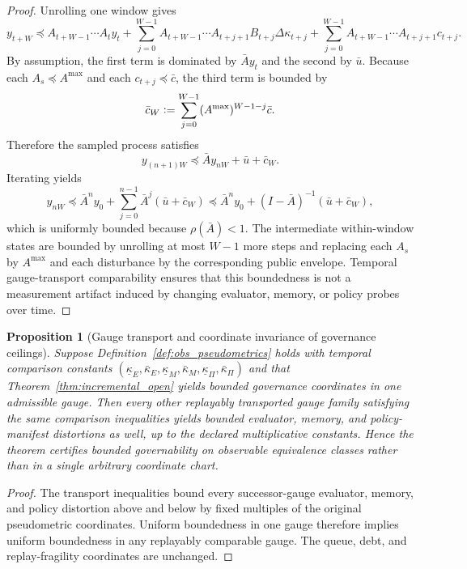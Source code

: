 \documentclass[11pt]{article}
\newtheorem{proposition}[theorem]{Proposition}
\theoremstyle{definition}
\newcommand{\1}{\mathbf{1}}
\newcommand{\Defeq}{\vcentcolon=}
\begin{document}
\begin{proof}
Unrolling one window gives
\[
y_{t+W}
\preceq
A_{t+W-1}\cdots A_t y_t
+
\sum_{j=0}^{W-1}A_{t+W-1}\cdots A_{t+j+1}B_{t+j}\Delta \kappa_{t+j}
+
\sum_{j=0}^{W-1}A_{t+W-1}\cdots A_{t+j+1}c_{t+j}.
\]
By assumption, the first term is dominated by $\bar A y_t$ and the second by $\bar u$. Because each $A_s\preceq A^{\max}$ and each $c_{t+j}\preceq \bar c$, the third term is bounded by
\[
\bar c_W \Defeq \sum_{j=0}^{W-1}(A^{\max})^{W-1-j}\bar c.
\]
Therefore the sampled process satisfies
\[
y_{(n+1)W}\preceq \bar A y_{nW} + \bar u + \bar c_W.
\]
Iterating yields
\[
y_{nW}\preceq \bar A^n y_0 + \sum_{j=0}^{n-1}\bar A^j(\bar u+\bar c_W)
\preceq
\bar A^n y_0 + (I-\bar A)^{-1}(\bar u+\bar c_W),
\]
which is uniformly bounded because $\rho(\bar A)<1$. The intermediate within-window states are bounded by unrolling at most $W-1$ more steps and replacing each $A_s$ by $A^{\max}$ and each disturbance by the corresponding public envelope. Temporal gauge-transport comparability ensures that this boundedness is not a measurement artifact induced by changing evaluator, memory, or policy probes over time.
\end{proof}

\begin{proposition}[Gauge transport and coordinate invariance of governance ceilings]\label{prop:gauge_transport}
Suppose Definition~\ref{def:obs_pseudometrics} holds with temporal comparison constants $(\underline\kappa_E,\bar\kappa_E,\underline\kappa_M,\bar\kappa_M,\underline\kappa_\Pi,\bar\kappa_\Pi)$ and that Theorem~\ref{thm:incremental_open} yields bounded governance coordinates in one admissible gauge. Then every other replayably transported gauge family satisfying the same comparison inequalities yields bounded evaluator, memory, and policy-manifest distortions as well, up to the declared multiplicative constants. Hence the theorem certifies bounded governability on observable equivalence classes rather than in a single arbitrary coordinate chart.
\end{proposition}

\begin{proof}
The transport inequalities bound every successor-gauge evaluator, memory, and policy distortion above and below by fixed multiples of the original pseudometric coordinates. Uniform boundedness in one gauge therefore implies uniform boundedness in any replayably comparable gauge. The queue, debt, and replay-fragility coordinates are unchanged.
\end{proof}
\end{document}
